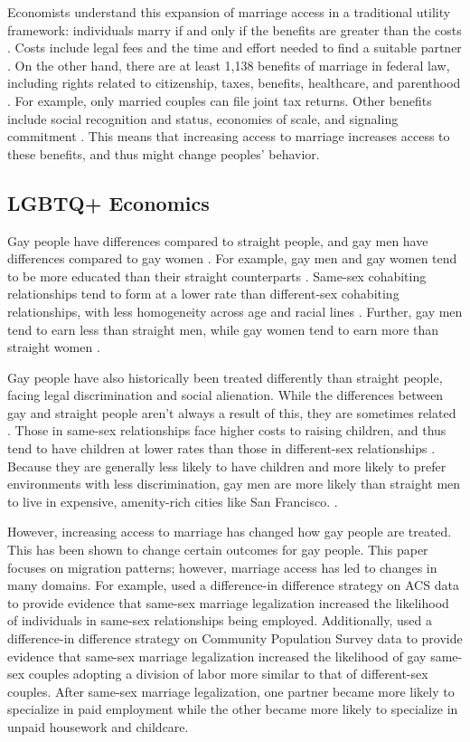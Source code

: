 \documentclass[12pt,letterpaper]{article}
\begin{document}
Economists understand this expansion of marriage access in a traditional utility framework: individuals marry if and only if the benefits are greater than the costs \citep{9}. Costs include legal fees and the time and effort needed to find a suitable partner \citep{9}. On the other hand, there are at least 1,138 benefits of marriage in federal law, including rights related to citizenship, taxes, benefits, healthcare, and parenthood \citep{1, 8}. For example, only married couples can file joint tax returns. Other benefits include social recognition and status, economies of scale, and signaling commitment \citep{8}. This means that increasing access to marriage increases access to these benefits, and thus might change peoples' behavior. 

\subsection{LGBTQ+ Economics}

Gay people have differences compared to straight people, and gay men have differences compared to gay women \citep{2, 15}. For example, gay men and gay women tend to be more educated than their straight counterparts \citep{2, 7, 11}. Same-sex cohabiting relationships tend to form at a lower rate than different-sex cohabiting relationships, with less homogeneity across age and racial lines \citep{2, 7}. Further, gay men tend to earn less than straight men, while gay women tend to earn more than straight women \citep{6}.

Gay people have also historically been treated differently than straight people, facing legal discrimination and social alienation. While the differences between gay and straight people aren’t always a result of this, they are sometimes related \citep{2}. Those in same-sex relationships face higher costs to raising children, and thus tend to have children at lower rates than those in different-sex relationships \citep{8, 10, 11}. Because they are generally less likely to have children and  more likely to prefer environments with less discrimination, gay men are more likely than straight men to live in expensive, amenity-rich cities like San Francisco. \citep{7, 10, 11, 13}.

However, increasing access to marriage has changed how gay people are treated. This has been shown to change certain outcomes for gay people. This paper focuses on migration patterns; however, marriage access has led to changes in many domains. For example, \citet{3} used a difference-in difference strategy on ACS data to provide evidence that same-sex marriage legalization increased the likelihood of individuals in same-sex relationships being employed. Additionally, \citet{30} used a difference-in difference strategy on Community Population Survey data to provide evidence that same-sex marriage legalization increased the likelihood of gay same-sex couples adopting a division of labor more similar to that of different-sex couples. After same-sex marriage legalization,  one partner became more likely to specialize in paid employment while the other became more likely to specialize in unpaid housework and childcare. 
\end{document}
